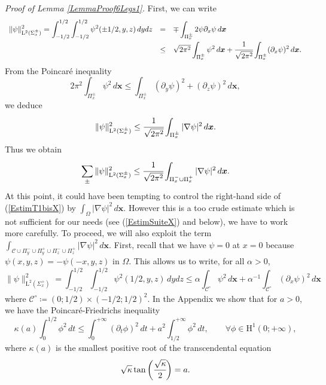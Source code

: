 \documentclass[11pt,a4paper]{article}
\newcommand{\dsp}{\displaystyle}
\newcommand{\Om}{\Omega}
\newcommand{\mrm}[1]{\mathrm{#1}}
\newcommand{\bfx}{\boldsymbol{x}}
\newcommand{\mL}{\mrm{L}}
\newcommand{\mH}{\mrm{H}}
\begin{document}
\noindent\textit{Proof of Lemma \ref{LemmaProof6Legs1}.}
First, we can write
\[
\begin{array}{rcl}
\dsp\|\psi\|_{\mL^2(\Sigma^\pm_x)}^2 =\dsp\int_{-1/2}^{1/2}\int_{-1/2}^{1/2}\psi^2(\pm1/2,y,z)\,dydz&=&\mp\dsp\int_{\Pi^\pm_x}2\psi\partial_x\psi\,d\bfx \\[8pt]
&\le&\sqrt{2\pi^2}\dsp\int_{\Pi^\pm_x}\psi^2\,d\bfx+\cfrac{1}{\sqrt{2\pi^2}}\dsp\int_{\Pi^\pm_x}(\partial_x\psi)^2\,d\bfx.
\end{array}
\]
From the Poincar\'e inequality
\[
2\pi^2\dsp\int_{\Pi^\pm_x}\psi^2\,d\bfx \le \dsp\int_{\Pi^\pm_x}(\partial_y\psi)^2+(\partial_z\psi)^2\,d\bfx,
\]
we deduce 
\[
\|\psi\|_{\mL^2(\Sigma^\pm_x)}^2 \le \cfrac{1}{\sqrt{2\pi^2}}\int_{\Pi^\pm_x}|\nabla\psi|^2\,d\bfx.
\]
Thus we obtain 
\begin{equation}\label{EstimT1bisX}
\sum_\pm\|\psi\|^2_{\mL^2(\Sigma^\pm_x)} \le \cfrac{1}{\sqrt{2\pi^2}}\int_{\Pi^-_x\cup\Pi^+_x}|\nabla\psi|^2\,d\bfx.
\end{equation}
At this point, it could have been tempting to control the right-hand side of (\ref{EstimT1bisX}) by $\int_{\Om}|\nabla\psi|^2\,d\bfx$. However this is a too crude estimate which is not sufficient for our needs (see (\ref{EstimSuiteX}) and below), we have to work more carefully. To proceed, we will also exploit the term $\int_{\mathcal{C}\cup\Pi^-_y\cup\Pi^+_y\cup\Pi^-_z\cup\Pi^+_z}|\nabla\psi|^2\,d\bfx$. First, recall that we have $\psi=0$ at $x=0$ because $\psi(x,y,z)=-\psi(-x,y,z)$ in $\Om$. This allows us to write, for all $\alpha>0$,
\begin{equation}\label{BiduleAlpha}
\|\psi\|_{\mL^2(\Sigma^+_x)}^2 =\dsp\int_{-1/2}^{1/2}\int_{-1/2}^{1/2}\psi^2(1/2,y,z)\,dydz\le\alpha\dsp\int_{\mathcal{C}^{\circ}}\psi^2\,d\bfx+\alpha^{-1}\dsp\int_{\mathcal{C}^{\circ}}(\partial_x\psi)^2\,d\bfx
\end{equation}
where $\mathcal{C}^{\circ}\coloneqq(0;1/2)\times(-1/2;1/2)^2$. In the Appendix we show that for $a>0$, we have the Poincar\'e-Friedrichs inequality
\begin{equation}\label{Fried_ineqX}
 \kappa(a)\int_{0}^{1/2}\phi^2\,dt \le \int_{0}^{+\infty}(\partial_t\phi)^2\,dt+a^2\int_{1/2}^{+\infty}\phi^2\,dt,\qquad \forall \phi\in\mH^1(0;+\infty),
\end{equation}
where $\kappa(a)$ is the smallest positive root of the transcendental equation
\begin{equation}\label{TransEqnLemmaX}
\sqrt{\kappa}\tan\bigg(\cfrac{\sqrt{\kappa}}{2}\bigg)=a.
\end{equation}
\end{document}
